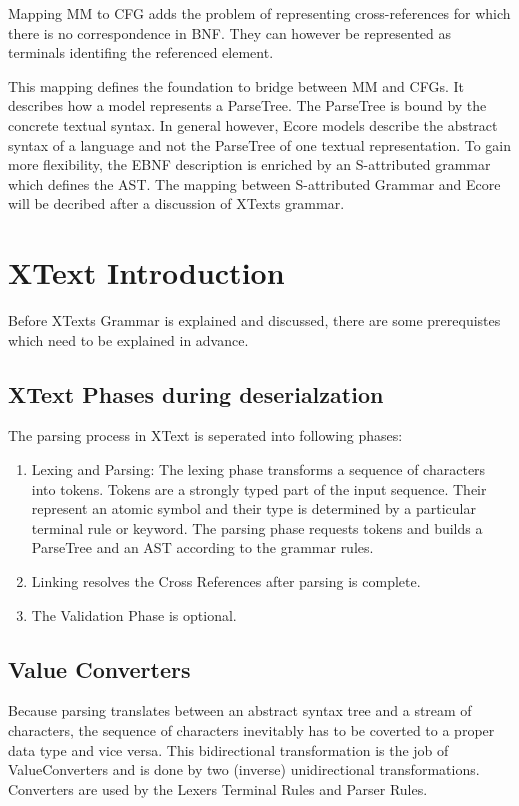 Mapping MM to CFG adds the problem of representing cross-references for which there is no correspondence in BNF. They can however be represented as terminals identifing the referenced element.   

This mapping defines the foundation to bridge between MM and CFGs. It describes how a model represents a ParseTree. The ParseTree is bound by the concrete textual syntax. In general however, Ecore models describe the abstract syntax of a language and not the ParseTree of one textual representation. To gain more flexibility, the EBNF description is enriched by an S-attributed grammar which defines the AST. The mapping between S-attributed Grammar and Ecore will be decribed after a discussion of XTexts grammar. 



\section{XText Introduction}
Before XTexts Grammar is explained and discussed, there are some prerequistes which need to be explained in advance.

\subsection{XText Phases during deserialzation}
The parsing process in XText is seperated into following phases:
\begin{enumerate}
	\item Lexing and Parsing: The lexing phase transforms a sequence of characters into tokens. Tokens are a strongly typed part of the input sequence. Their represent an atomic symbol and their type is determined by a particular terminal rule or keyword. The parsing phase requests tokens and builds a ParseTree and an AST according to the grammar rules.
	\item Linking resolves the Cross References after parsing is complete.
	\item The Validation Phase is optional.
\end{enumerate}

\subsection{Value Converters}
Because parsing translates between an abstract syntax tree and a stream of characters, the sequence of characters inevitably has to be coverted to a proper data type and vice versa. This bidirectional transformation is the job of ValueConverters and is done by two (inverse) unidirectional transformations. Converters are used by the Lexers Terminal Rules and Parser Rules.

